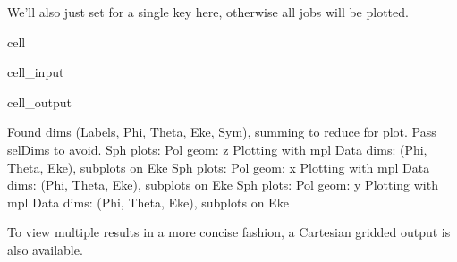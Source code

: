 \documentclass[letterpaper,10pt,english]{jupyterBook}
\begin{document}
\sphinxAtStartPar
We’ll also just set for a single key here, otherwise all jobs will be plotted.

\begin{sphinxuseclass}{cell}\begin{sphinxVerbatimInput}

\begin{sphinxuseclass}{cell_input}
\begin{sphinxVerbatim}[commandchars=\\\{\}]
     \PYG{p}{[}  \PYG{p}{]}

\end{sphinxVerbatim}

\end{sphinxuseclass}\end{sphinxVerbatimInput}
\begin{sphinxVerbatimOutput}

\begin{sphinxuseclass}{cell_output}
\begin{sphinxVerbatim}[commandchars=\\\{\}]
Found dims (\PYGZsq{}Labels\PYGZsq{}, \PYGZsq{}Phi\PYGZsq{}, \PYGZsq{}Theta\PYGZsq{}, \PYGZsq{}Eke\PYGZsq{}, \PYGZsq{}Sym\PYGZsq{}), summing to reduce for plot. Pass selDims to avoid.
Sph plots: Pol geom: z
Plotting with mpl
Data dims: (\PYGZsq{}Phi\PYGZsq{}, \PYGZsq{}Theta\PYGZsq{}, \PYGZsq{}Eke\PYGZsq{}), subplots on Eke
Sph plots: Pol geom: x
Plotting with mpl
Data dims: (\PYGZsq{}Phi\PYGZsq{}, \PYGZsq{}Theta\PYGZsq{}, \PYGZsq{}Eke\PYGZsq{}), subplots on Eke
Sph plots: Pol geom: y
Plotting with mpl
Data dims: (\PYGZsq{}Phi\PYGZsq{}, \PYGZsq{}Theta\PYGZsq{}, \PYGZsq{}Eke\PYGZsq{}), subplots on Eke
\end{sphinxVerbatim}

\noindent{}

\noindent{}

\noindent{}

\noindent{}

\noindent{}

\noindent{}

\end{sphinxuseclass}\end{sphinxVerbatimOutput}

\end{sphinxuseclass}
\sphinxAtStartPar
To view multiple results in a more concise fashion, a Cartesian gridded output is also available.
\end{document}
